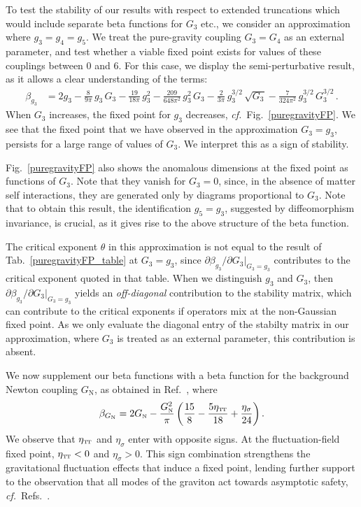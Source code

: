 \documentclass[11pt]{book} %
\newcommand\TTspace{ -1pt }
\newcommand\etaTT{ \eta_{\scriptscriptstyle{\mathrm{T\hspace{\TTspace}T}}} }
\newcommand\GNewton{ G_{\scriptscriptstyle{\mathrm{N}}} }
\newcommand\Gback{ \GNewton } %
\newcommand\cf{\textit{cf.}\ }
\numberwithin{equation}{chapter}
\begin{document}
To test the stability of our results with respect to extended truncations which would include separate
beta functions for $G_3$ etc.,
we consider an approximation where $g_3=g_4=g_5$.
We treat the pure-gravity coupling $G_3=G_4$ as an external parameter,
and test whether a viable fixed point exists for values of these couplings between 0 and 6.
For this case, we display the semi-perturbative result, as it allows a clear understanding of the terms:
\begin{align}
  \beta_{g_3} &= 2 g_3
  - \frac{8}{9 \pi}       \, g_3       \, G_3
  - \frac{19}{18 \pi}     \, g_3^2
  - \frac{209}{648 \pi^2} \, g_3^2     \, G_3
  - \frac{2}{3 \pi}       \, g_3^{3/2} \, \sqrt{G_3}
  - \frac{7}{324 \pi^2}   \, g_3^{3/2} \, G_3^{3/2} \,.
\end{align}
When $G_3$ increases, the fixed point for $g_3$ decreases, \cf Fig.~\ref{puregravityFP}.
We see that the fixed point that we have observed in the approximation $G_3=g_3$,
persists for a large range of values of $G_3$.
We interpret this as a sign of stability.

Fig.~\ref{puregravityFP} also shows the anomalous dimensions at the fixed point as functions of $G_3$.
Note that they vanish for $G_3=0$, since, in the absence of matter self interactions, they are
generated only by diagrams proportional to $G_3$.
Note that to obtain this result, the identification $g_5=g_3$,
suggested by diffeomorphism invariance, is crucial,
as it gives rise to the above structure of the beta function.

The critical exponent $\theta$ in this approximation is not equal to the result of
Tab.~\ref{puregravityFP_table} at $G_3=g_3$,
since $\partial \beta_{g_3}/\partial G_3 \vert_{G_3=g_3}$ contributes to the critical
exponent quoted in that table. When we distinguish $g_3$ and $G_3$,
then  $\partial \beta_{g_3}/\partial G_3 \vert_{G_3=g_3}$ yields an \emph{off-diagonal} contribution
to the stability matrix, which can contribute to the critical exponents if operators mix
at the non-Gaussian fixed point. As we only evaluate the diagonal entry of the stabilty
matrix in our approximation, where $G_3$ is treated as an external parameter, this contribution is absent.

We now supplement our beta functions with a beta function for the background Newton coupling $\Gback$,
as obtained in Ref.~\cite{Percacci:2015wwa}, where
\begin{align}
  \beta_{\Gback} = 2 \Gback - \frac{\Gback^2}{\pi}
  \left(
    \frac{15}{8} - \frac{5 \etaTT}{18 } + \frac{\eta_{\sigma}}{24}
  \right).
\end{align}
We observe that $\etaTT$ and $\eta_{\sigma}$ enter with opposite signs.
At the fluctuation-field fixed point, $\etaTT<0$  and $\eta_{\sigma}>0$.
This sign combination strengthens the gravitational fluctuation effects that induce a fixed point,
lending further support to the observation that all modes of the graviton act towards asymptotic
safety, \cf Refs.~\cite{Reuter:2008qx, Reuter:2008wj}.
\end{document}
